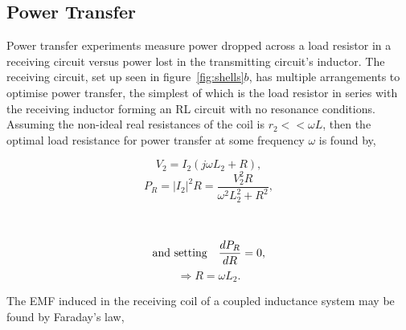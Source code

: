 \documentclass[11pt]{iopart}
\begin{document}


\subsection{Power Transfer}
Power transfer experiments measure power dropped across a load
resistor in a receiving circuit versus power lost in the transmitting
circuit's inductor. The receiving circuit, set up seen in
figure~\ref{fig:shells}$b$, has multiple arrangements to optimise power
transfer, the simplest of which is the load resistor in series with
the receiving inductor forming an RL circuit with no resonance conditions. Assuming the non-ideal
real resistances of the coil is $r_2 << \omega L$, then the optimal
load resistance for power transfer at some frequency $\omega$ is found
by,
\begin{center}
\begin{minipage}{0.4\linewidth}
\begin{equation}
  V_2 = I_2 (j\omega L_2 + R),  
\end{equation}
\begin{equation}
  P_R = |I_2|^2R = \frac{V_2^2R}{\omega^2L_2^2 + R^2},
  \label{eqn:RL-max-theory}
\end{equation}
\end{minipage}
~~
\vrule
\begin{minipage}{0.4\linewidth}
  $$\text{and setting\quad} \frac{dP_R}{dR} = 0,$$ 
\begin{equation}
  \Rightarrow R = \omega L_2.
  \label{eqn:RL-max}
\end{equation}
\end{minipage}
\end{center}
\vspace{0.2em}
The EMF induced in the receiving coil of a coupled inductance system
may be found by Faraday's law,
\vspace{-0.5em}
\end{document}
